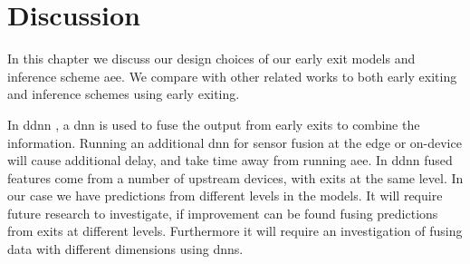 \hypertarget{discussion}{%
\chapter{Discussion}\label{ch:discussion}}

In this chapter we discuss our design choices of our early exit models and inference scheme \gls{aee}. We compare with other related works to both early exiting and inference schemes using early exiting.

In \gls{ddnn} \cite{teerapittayanon_distributed_2017}, a \gls{dnn} is used to fuse the output from early exits to combine the information. Running an additional \gls{dnn} for sensor fusion at the edge or on-device will cause additional delay, and take time away from running \gls{aee}. In \gls{ddnn} fused features come from a number of upstream devices, with exits at the same level. In our case we have predictions from different levels in the models. It will require future research to investigate, if improvement can be found fusing predictions from exits at different levels. Furthermore it will require an investigation of fusing data with different dimensions using \gls{dnn}s. 

